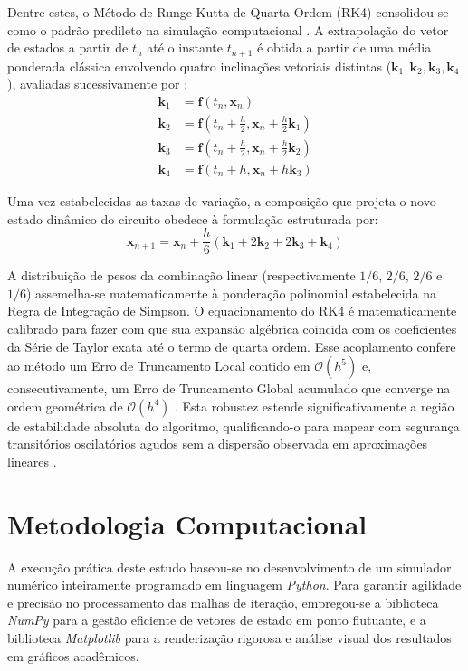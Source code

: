 \documentclass[11pt, a4paper]{article}
\begin{document}
Dentre estes, o Método de Runge-Kutta de Quarta Ordem (RK4) consolidou-se como o padrão predileto na simulação computacional \cite{shaikh2022}. A extrapolação do vetor de estados a partir de $t_n$ até o instante $t_{n+1}$ é obtida a partir de uma média ponderada clássica envolvendo quatro inclinações vetoriais distintas ($\mathbf{k}_1, \mathbf{k}_2, \mathbf{k}_3, \mathbf{k}_4$), avaliadas sucessivamente por \cite{razak2025}:
\begin{align}
    \mathbf{k}_1 &= \mathbf{f}(t_n, \mathbf{x}_n) \\
    \mathbf{k}_2 &= \mathbf{f}\left(t_n + \frac{h}{2}, \mathbf{x}_n + \frac{h}{2}\mathbf{k}_1\right) \\
    \mathbf{k}_3 &= \mathbf{f}\left(t_n + \frac{h}{2}, \mathbf{x}_n + \frac{h}{2}\mathbf{k}_2\right) \\
    \mathbf{k}_4 &= \mathbf{f}(t_n + h, \mathbf{x}_n + h \mathbf{k}_3)
\end{align}

Uma vez estabelecidas as taxas de variação, a composição que projeta o novo estado dinâmico do circuito obedece à formulação estruturada por:
\begin{equation}
    \mathbf{x}_{n+1} = \mathbf{x}_n + \frac{h}{6}(\mathbf{k}_1 + 2\mathbf{k}_2 + 2\mathbf{k}_3 + \mathbf{k}_4)
\end{equation}

A distribuição de pesos da combinação linear (respectivamente $1/6$, $2/6$, $2/6$ e $1/6$) assemelha-se matematicamente à ponderação polinomial estabelecida na Regra de Integração de Simpson. O equacionamento do RK4 é matematicamente calibrado para fazer com que sua expansão algébrica coincida com os coeficientes da Série de Taylor exata até o termo de quarta ordem. Esse acoplamento confere ao método um Erro de Truncamento Local contido em $\mathcal{O}(h^5)$ e, consecutivamente, um Erro de Truncamento Global acumulado que converge na ordem geométrica de $\mathcal{O}(h^4)$ \cite{modelagem2026}. Esta robustez estende significativamente a região de estabilidade absoluta do algoritmo, qualificando-o para mapear com segurança transitórios oscilatórios agudos sem a dispersão observada em aproximações lineares \cite{firgelli2026rk}.

\section{Metodologia Computacional}

A execução prática deste estudo baseou-se no desenvolvimento de um simulador numérico inteiramente programado em linguagem \textit{Python}. Para garantir agilidade e precisão no processamento das malhas de iteração, empregou-se a biblioteca \textit{NumPy} para a gestão eficiente de vetores de estado em ponto flutuante, e a biblioteca \textit{Matplotlib} para a renderização rigorosa e análise visual dos resultados em gráficos acadêmicos.
\end{document}
